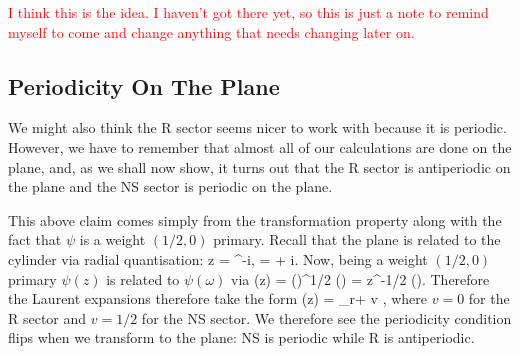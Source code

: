 \br
    \textcolor{red}{I think this is the idea. I haven't got there yet, so this is just a note to remind myself to come and change anything that needs changing later on. }
\er 

\subsection{Periodicity On The Plane}

We might also think the R sector seems nicer to work with because it is periodic. However, we have to remember that almost all of our calculations are done on the plane, and, as we shall now show, it turns out that the R sector is antiperiodic on the plane and the NS sector is periodic on the plane. 

This above claim comes simply from the transformation property along with the fact that $\psi$ is a weight $(1/2,0)$ primary. Recall that the plane is related to the cylinder via radial quantisation:
\bse 
    z = \exp^{-i\omega}, \qquad \omega = \sig + i\tau.
\ese 
Now, being a weight $(1/2,0)$ primary $\psi(z)$ is related to $\psi(\omega)$ via 
\bse 
    \psi(z) = \bigg(\bigg)^{1/2} \psi(\omega) = z^{-1/2} \psi(\omega).
\ese 
Therefore the Laurent expansions therefore take the form 
\be 
\label{eqn:NSRPlaneLaurentExpansion}
    \psi(z) = \sum_{r\in \Z + v} ,
\ee 
where $v=0$ for the R sector and $v=1/2$ for the NS sector. We therefore see the periodicity condition flips when we transform to the plane: NS is periodic while R is antiperiodic. 